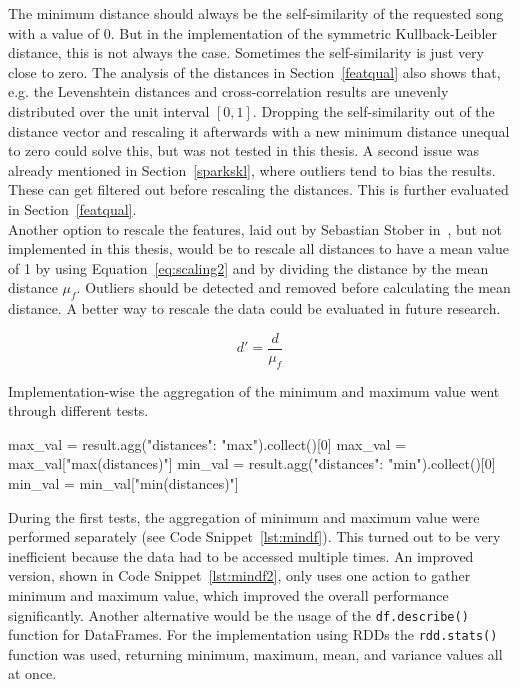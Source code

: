 \noindent The minimum distance should always be the self-similarity of the requested song with a value of 0. But in the implementation of the symmetric Kullback-Leibler distance, this is not always the case. Sometimes the self-similarity is just very close to zero. The analysis of the distances in Section~\ref{featqual} also shows that, e.g. the Levenshtein distances and cross-correlation results are unevenly distributed over the unit interval $[0,1]$. Dropping the self-similarity out of the distance vector and rescaling it afterwards with a new minimum distance unequal to zero could solve this, but was not tested in this thesis. A second issue was already mentioned in Section~\ref{sparkskl}, where outliers tend to bias the results. These can get filtered out before rescaling the distances. This is further evaluated in Section~\ref{featqual}.\\
Another option to rescale the features, laid out by Sebastian Stober in~\cite[pp. 543ff]{musicdata}, but not implemented in this thesis, would be to rescale all distances to have a mean value of 1 by using Equation~\eqref{eq:scaling2} and by dividing the distance by the mean distance $\mu_f$. Outliers should be detected and removed before calculating the mean distance. 
A better way to rescale the data could be evaluated in future research. 

\begin{equation} \label{eq:scaling2}
d' = \frac{d}{\mu_f}
\end{equation} 

\noindent Implementation-wise the aggregation of the minimum and maximum value went through different tests. 

\begin{pythonCode}[frame=single,label={lst:mindf},caption={Minimum and maximum aggregation separate},captionpos=b]
max_val = result.agg({"distances": "max"}).collect()[0]
max_val = max_val["max(distances)"]
min_val = result.agg({"distances": "min"}).collect()[0]
min_val = min_val["min(distances)"]
\end{pythonCode}

\noindent During the first tests, the aggregation of minimum and maximum value were performed separately (see Code Snippet~\ref{lst:mindf}). This turned out to be very inefficient because the data had to be accessed multiple times. 
\noindent An improved version, shown in Code Snippet~\ref{lst:mindf2}, only uses one action to gather minimum and maximum value, which improved the overall performance significantly. 
\noindent Another alternative would be the usage of the \lstinline{df.describe()} function for DataFrames. For the implementation using RDDs the \lstinline{rdd.stats()} function was used, returning minimum, maximum, mean, and variance values all at once. 

